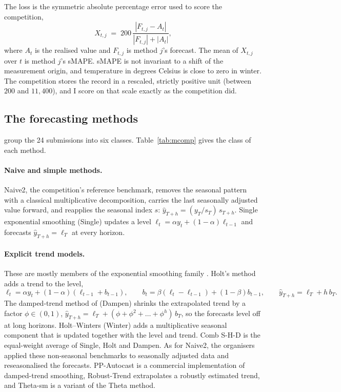 The loss is the symmetric absolute percentage error used to score the competition,
\begin{equation}
  X_{t,j} \;=\; 200\,\frac{|F_{t,j}-A_t|}{|F_{t,j}|+|A_t|},
  \label{eq:smape}
\end{equation}
where $A_t$ is the realised value and $F_{t,j}$ is method $j$'s forecast. The mean of
$X_{t,j}$ over $t$ is method $j$'s sMAPE. sMAPE is not invariant to a shift of the
measurement origin, and temperature in degrees Celsius is close to zero in winter. The
competition stores the record in a rescaled, strictly positive unit (between $200$ and
$11{,}400$), and I score on that scale exactly as the competition did.

\subsection{The forecasting methods}
\label{sec:apps-mcomp-methods}

\citet{makridakis2000m3} group the 24 submissions into six classes.
Table~\ref{tab:mcomp} gives the class of each method.

\paragraph{Naive and simple methods.} Naive2, the competition's reference benchmark,
removes the seasonal pattern with a classical multiplicative decomposition, carries the
last seasonally adjusted value forward, and reapplies the seasonal index $s$:
$\hat y_{T+h}=(y_T/s_T)\,s_{T+h}$. Single exponential smoothing (Single) updates a level
$\ell_t=\alpha y_t+(1-\alpha)\ell_{t-1}$ and forecasts $\hat y_{T+h}=\ell_T$ at every
horizon.

\paragraph{Explicit trend models.} These are mostly members of the exponential
smoothing family \citep{hyndman2008ets}. Holt's method adds a trend to the level,
\[
  \ell_t=\alpha y_t+(1-\alpha)(\ell_{t-1}+b_{t-1}),\qquad
  b_t=\beta(\ell_t-\ell_{t-1})+(1-\beta)b_{t-1},\qquad
  \hat y_{T+h}=\ell_T+h\,b_T .
\]
The damped-trend method of \citet{gardner1985damped} (Dampen) shrinks the extrapolated
trend by a factor $\phi\in(0,1)$, $\hat y_{T+h}=\ell_T+(\phi+\phi^2+\dots+\phi^h)\,b_T$,
so the forecasts level off at long horizons. Holt--Winters (Winter) adds a
multiplicative seasonal component that is updated together with the level and trend.
Comb S-H-D is the equal-weight average of Single, Holt and Dampen. As for Naive2, the
organisers applied these non-seasonal benchmarks to seasonally adjusted data and
reseasonalised the forecasts. PP-Autocast is a commercial implementation of
damped-trend smoothing, Robust-Trend extrapolates a robustly estimated trend, and
Theta-sm is a variant of the Theta method.

